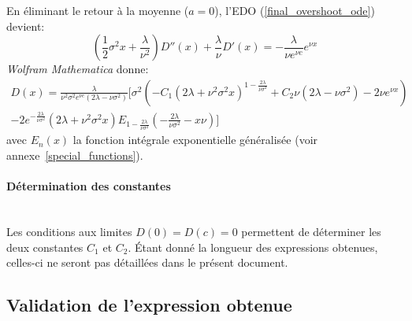 En éliminant le retour à la moyenne ($a=0$), l'\acs{EDO} (\ref{final_overshoot_ode}) devient:
\begin{equation}\label{particular_overshoot_ode}
    \left(\frac{1}{2}\sigma^2x+\frac{\lambda}{\nu^2}\right)D''(x)+\frac{\lambda}{\nu}D'(x) =-\frac{\lambda}{\nu e^{\nu c}}e^{\nu x}
\end{equation}
\textit{Wolfram Mathematica} donne:
\begin{equation}\label{sol_overshoot}
    \begin{aligned}
            D(x)=\frac{\lambda}{{\nu^2\sigma^2e^{\nu c}(2\lambda-\nu\sigma^2)}}\Bigg[\sigma^2\left(-C_1 \left(2 \lambda +\nu ^2 \sigma ^2 x\right)^{1-\frac{2 \lambda }{\nu  \sigma ^2}}+C_2 \nu  \left(2 \lambda -\nu  \sigma ^2\right)-2 \nu  e^{\nu  x}\right) \\-2 e^{-\frac{2 \lambda }{\nu  \sigma ^2}} \left(2 \lambda +\nu ^2 \sigma ^2 x\right) E_{1-\frac{2 \lambda }{\nu  \sigma ^2}}\left(-\frac{2 \lambda }{\nu  \sigma ^2}-x \nu \right)\Bigg]
    \end{aligned}
\end{equation}
avec $E_n(x)$ la fonction intégrale exponentielle généralisée (voir annexe~\ref{special_functions}).

\paragraph{Détermination des constantes}\phantom{}\\
Les conditions aux limites $D(0)=D(c)=0$ permettent de déterminer les deux constantes $C_1$ et $C_2$. Étant donné la longueur des expressions obtenues, celles-ci ne seront pas détaillées dans le présent document.

\subsection{Validation de l'expression obtenue}
